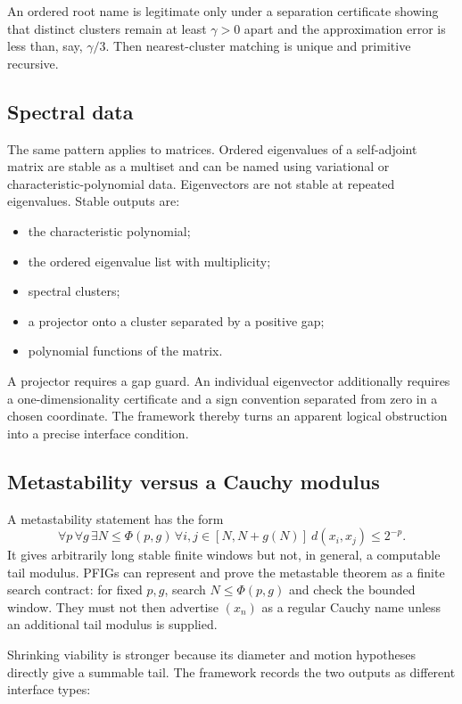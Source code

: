 An ordered root name is legitimate only under a separation certificate showing that distinct clusters remain at least \(\gamma>0\) apart and the approximation error is less than, say, \(\gamma/3\).  Then nearest-cluster matching is unique and primitive recursive.

\subsection{Spectral data}

The same pattern applies to matrices.  Ordered eigenvalues of a self-adjoint matrix are stable as a multiset and can be named using variational or characteristic-polynomial data.  Eigenvectors are not stable at repeated eigenvalues.  Stable outputs are:

\begin{itemize}
\item the characteristic polynomial;
\item the ordered eigenvalue list with multiplicity;
\item spectral clusters;
\item a projector onto a cluster separated by a positive gap;
\item polynomial functions of the matrix.
\end{itemize}

A projector requires a gap guard.  An individual eigenvector additionally requires a one-dimensionality certificate and a sign convention separated from zero in a chosen coordinate.  The framework thereby turns an apparent logical obstruction into a precise interface condition.

\subsection{Metastability versus a Cauchy modulus}

A metastability statement has the form
\[
 \forall p\,\forall g\,\exists N\le\Phi(p,g)\,
 \forall i,j\in[N,N+g(N)]\ d(x_i,x_j)\le2^{-p}.
\]
It gives arbitrarily long stable finite windows but not, in general, a computable tail modulus.  PFIGs can represent and prove the metastable theorem as a finite search contract: for fixed \(p,g\), search \(N\le\Phi(p,g)\) and check the bounded window.  They must not then advertise \((x_n)\) as a regular Cauchy name unless an additional tail modulus is supplied.

Shrinking viability is stronger because its diameter and motion hypotheses directly give a summable tail.  The framework records the two outputs as different interface types:

